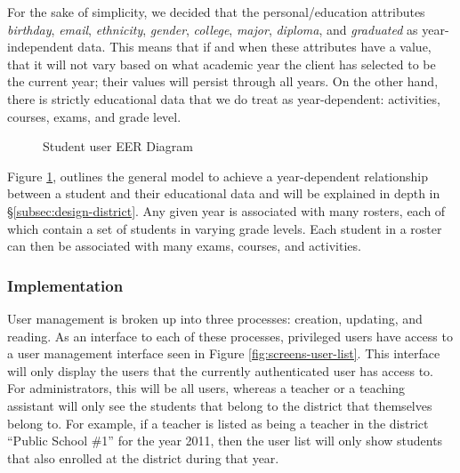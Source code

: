 For the sake of simplicity, we decided that the personal/education attributes \emph{birthday}, \emph{email}, \emph{ethnicity}, \emph{gender}, \emph{college}, \emph{major}, \emph{diploma}, and \emph{graduated} as year-independent data. This means that if and when these attributes have a value, that it will not vary based on what academic year the client has selected to be the current year; their values will persist through all years. On the other hand, there is strictly educational data that we do treat as year-dependent: activities, courses, exams, and grade level.

\begin{figure}[h!]
	\centering
	\caption{Student user EER Diagram}
	\label{fig:er-user-student}
\end{figure}

Figure \ref{fig:er-user-student}, outlines the general model to achieve a year-dependent relationship between a student and their educational data and will be explained in depth in \S \ref{subsec:design-district}. Any given year is associated with many rosters, each of which contain a set of students in varying grade levels. Each student in a roster can then be associated with many exams, courses, and activities. 

\subsubsection{Implementation}
User management is broken up into three processes: creation, updating, and reading. As an interface to each of these processes, privileged users have access to a user management interface seen in Figure \ref{fig:screens-user-list}. This interface will only display the users that the currently authenticated user has access to. For administrators, this will be all users, whereas a teacher or a teaching assistant will only see the students that belong to the district that themselves belong to. For example, if a teacher is listed as being a teacher in the district ``Public School \#1'' for the year 2011, then the user list will only show students that also enrolled at the district during that year.

